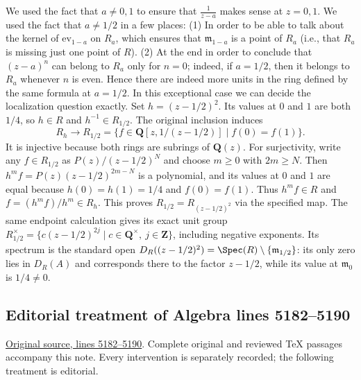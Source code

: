 \begin{example}
\medskip\noindent
We used the fact that $a\neq 0, 1$ to ensure that
$\frac{1}{z-a}$ makes sense at $z = 0, 1$.  We used the fact that
$a\neq 1/2$ in a few places: (1) In order to be able to talk about
the kernel of $\text{ev}_{1-a}$ on $R_a$, which ensures that
$\mathfrak{m}_{1-a}$ is a point of $R_a$ (i.e., that $R_a$ is
missing just one point of $R$). (2) At the end in order to conclude
that $(z-a)^n$ can belong to $R_a$ only for $n = 0$; indeed, if
$a = 1/2$, then it belongs to $R_a$ whenever $n$ is even. Hence
there are indeed more units in the ring defined by the same formula
at $a=1/2$. In this exceptional case we can decide the localization
question exactly. Set $h=(z-1/2)^2$. Its values at $0$ and $1$ are
both $1/4$, so $h\in R$ and $h^{-1}\in R_{1/2}$.
The original inclusion induces
$$
R_h\longrightarrow
R_{1/2}=\{f\in\mathbf Q[z,1/(z-1/2)]\mid f(0)=f(1)\}.
$$
It is injective because both rings are subrings of $\mathbf Q(z)$.
For surjectivity, write any $f\in R_{1/2}$ as
$P(z)/(z-1/2)^N$ and choose $m\geq0$ with $2m\geq N$.
Then $h^mf=P(z)(z-1/2)^{2m-N}$ is a polynomial, and its values at
$0$ and $1$ are equal because $h(0)=h(1)=1/4$ and $f(0)=f(1)$.
Thus $h^mf\in R$ and $f=(h^mf)/h^m\in R_h$.
This proves $R_{1/2}=R_{(z-1/2)^2}$ via the specified map.
The same endpoint calculation gives its exact unit group
$R_{1/2}^{\times}=\{c(z-1/2)^{2j}\mid c\in\mathbf Q^{\times},\ j\in\mathbf Z\}$,
including negative exponents. Its spectrum is the standard open
$D_R((z-1/2)^2)=\Spec(R)\setminus\{\mathfrak m_{1/2}\}$:
its only zero lies in $D_R(A)$ and corresponds there to the factor
$z-1/2$, while its value at $\mathfrak m_0$ is $1/4\ne0$.
\end{example}


\subsection{Editorial treatment of Algebra lines 5182--5190}

\hypertarget{algebra-context-028}{}

\noindent\href{https://github.com/stacks/stacks-project/blob/a04446e57ec1fbc252a871afcec7752fb2807b14/algebra.tex\#L5182}{Original source, lines 5182--5190}. Complete original and reviewed TeX passages accompany this note. Every intervention is separately recorded; the following treatment is editorial.



